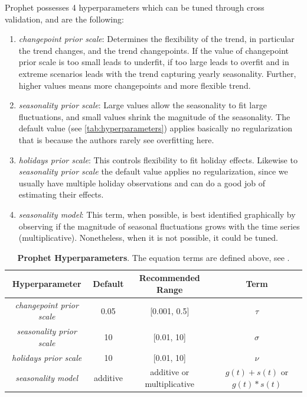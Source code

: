 Prophet possesses 4 hyperparameters which can be tuned through cross validation, and are the following:

\begin{enumerate}
\item \textit{changepoint prior scale}: Determines the flexibility of the trend, in particular the trend changes, and the trend changepoints. If the value of changepoint prior scale is too small leads to underfit, if too large leads to overfit and in extreme scenarios leads with the trend capturing yearly seasonality. Further, higher values means more changepoints and more flexible trend.
\item \textit{seasonality prior scale}: Large values allow the seasonality to fit large fluctuations, and small values shrink the magnitude of the seasonality. The default value (see \autoref{tab:hyperparameters}) applies basically no regularization that is because the authors rarely see overfitting here.  
\item \textit{holidays prior scale}: This controls flexibility to fit holiday effects. Likewise to \textit{seasonality prior scale} the default value applies no regularization, since we usually have multiple holiday observations and can do a good job of estimating their effects. 
\item \textit{seasonality model}: This term, when possible, is best identified graphically by observing if the magnitude of seasonal fluctuations grows with the time series (multiplicative). Nonetheless, when it is not possible, it could be tuned. 
\end{enumerate}

\begin{table}[!htb]
  \caption[Prophet Hyperparameters]{\textbf{Prophet Hyperparameters}. The equation terms are defined above, see .}
  \begin{scriptsize}
    \begin{tabulary}{0.65\linewidth}{cccc}
      \textbf{Hyperparameter} & \textbf{Default} & \textbf{Recommended Range} & \textbf{Term} \\ \hline
      \textit{changepoint prior scale} & 0.05 & [0.001, 0.5] & $\tau$  \\
      \textit{seasonality prior scale} & 10  & [0.01, 10] & $\sigma$  \\
      \textit{holidays prior scale} & 10  & [0.01, 10] & $\nu$ \\
      \textit{seasonality model} & additive  & additive or multiplicative & $g(t) + s(t)$ or  $g(t) * s(t)$ \\
    \end{tabulary}
  \end{scriptsize}
  \label{tab:hyperparameters}
\end{table}

